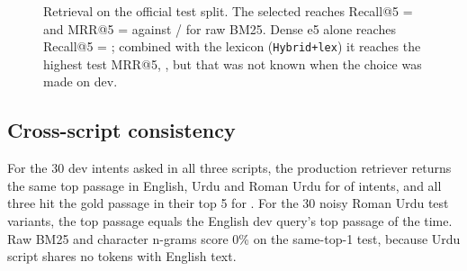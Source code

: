 \documentclass[11pt,a4paper]{article}
\def\addplotcoords#1#2{\expandafter\addplotcoordsi\expandafter{#2}{#1}}
\def\addplotcoordsi#1#2{\addplot[#2] coordinates {#1};}
\begin{document}
\begin{figure}[H]
\centering
{}
\caption{Retrieval on the official test split. The selected \FinalMethod{} reaches Recall@5 = \FinalRecall{} and MRR@5 =
\FinalMRR{} against \BaseRecall{} / \BaseMRR{} for raw BM25. Dense e5 alone reaches Recall@5 = \DenseRecall; combined with the
lexicon (\texttt{Hybrid+lex}) it reaches the highest test MRR@5, \HybridLexMRR, but that was not known when the choice was made
on dev.}
\label{fig:rettest}
\end{figure}

\subsection{Cross-script consistency}
For the 30 dev intents asked in all three scripts, the production retriever returns the same top passage in English, Urdu and
Roman Urdu for \CrossTopOne{} of intents, and all three hit the gold passage in their top 5 for \CrossAllHit. For the 30 noisy Roman
Urdu test variants, the top passage equals the English dev query's top passage \CrossSV{} of the time. Raw BM25 and character
n-grams score 0\% on the same-top-1 test, because Urdu script shares no tokens with English text.
\end{document}
